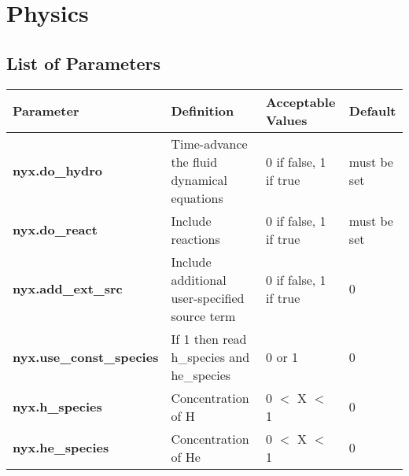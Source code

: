 \section{Physics}

\subsection{List of Parameters}

\begin{table*}[h]
\begin{scriptsize}
\begin{center}
\begin{tabular}{|l|l|l|l|} \hline
Parameter & Definition & Acceptable Values &Default\\
\hline
{\bf nyx.do\_hydro} & Time-advance the fluid dynamical equations & 0 if false, 1 if true & must be set \\
{\bf nyx.do\_react} & Include reactions                          & 0 if false, 1 if true & must be set \\
{\bf nyx.add\_ext\_src} & Include additional user-specified source term & 0 if false, 1 if true & 0 \\
{\bf nyx.use\_const\_species} & If 1 then read h\_species and he\_species & 0 or 1 & 0 \\
{\bf nyx.h\_species}  & Concentration of H  & 0 $<$ X $<$ 1 & 0 \\
{\bf nyx.he\_species} & Concentration of He & 0 $<$ X $<$ 1 & 0 \\
\hline
\end{tabular}
\label{Table:Physics}
\end{center}
\end{scriptsize}
\end{table*}

